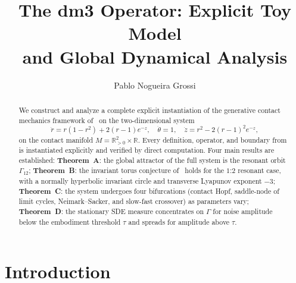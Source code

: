 \documentclass[reqno]{amsart}
\numberwithin{equation}{section}
\theoremstyle{plain}
\theoremstyle{definition}
\theoremstyle{remark}
\newcommand{\R}{\mathbb{R}}
\newcommand{\Orb}{\Gamma}
\begin{document}

\title[dm3 Operator: Toy Model]{%
  The dm3 Operator: Explicit Toy Model\\
  and Global Dynamical Analysis}

\author{Pablo Nogueira Grossi}
\address{Academic Coordinator, UCEDA School (ESL), Elizabeth, NJ\\
Newark, NJ, USA}



\begin{abstract}
We construct and analyze a complete explicit instantiation of the
generative contact mechanics framework of~\cite{Paper1} on the
two-dimensional system
\[
  \dot r = r(1-r^2)+2(r-1)e^{-z},\quad
  \dot\theta = 1,\quad
  \dot z = r^2 - 2(r-1)^2 e^{-z},
\]
on the contact manifold $M=\R^2_{>0}\times\R$. Every definition,
operator, and boundary from~\cite{Paper1} is instantiated explicitly
and verified by direct computation. Four main results are established:
\textbf{Theorem~A}: the global attractor of the full system is the
resonant orbit $\Orb_{12}$; \textbf{Theorem~B}: the invariant torus
conjecture of~\cite{Paper1} holds for the $1$:$2$ resonant case,
with a normally hyperbolic invariant circle and transverse Lyapunov
exponent $-3$; \textbf{Theorem~C}: the system undergoes four
bifurcations (contact Hopf, saddle-node of limit cycles,
Neimark--Sacker, and slow-fast crossover) as parameters vary;
\textbf{Theorem~D}: the stationary SDE measure concentrates on
$\Orb$ for noise amplitude below the embodiment threshold $\tau$ and
spreads for amplitude above $\tau$.
\end{abstract}


\maketitle
\tableofcontents

\section{Introduction}\label{sec:intro}
\end{document}
